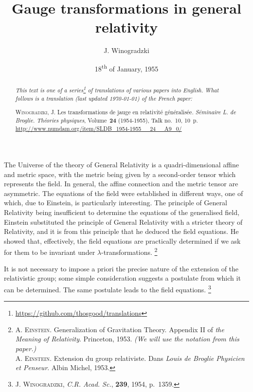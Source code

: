 \documentclass{article}
\newcommand{\oldpage}[1]{\marginpar{\footnotesize$\Big\vert$ \textit{p.~#1}}}
\begin{document}
\renewcommand{\abstractname}{Translator's note.}

\title{Gauge transformations in general relativity}
\author{J. Winogradzki}
\date{18\textsuperscript{th} of January, 1955}
\maketitle

\begin{abstract}
  \renewcommand*{\thefootnote}{\fnsymbol{footnote}}
  \emph{This text is one of a series\footnote{\url{https://github.com/thosgood/translations}} of translations of various papers into English.}
  \emph{What follows is a translation (last updated \today) of the French paper:}

  \medskip\noindent
  \textsc{Winogradzki, J}. Les transformations de jauge en relativité généralisée. \emph{Séminaire L. de Broglie. Théories physiques}, Volume~\textbf{24} (1954-1955), Talk no.~10, 10~p. {\footnotesize\url{http://www.numdam.org/item/SLDB_1954-1955__24__A9_0/}}
\end{abstract}

\setcounter{footnote}{0}

\tableofcontents



\bigskip\bigskip
\oldpage{10-01}
The Universe of the theory of General Relativity is a quadri-dimensional affine and metric space, with the metric being given by a second-order tensor which represents the field.
In general, the affine connection and the metric tensor are asymmetric.
The equations of the field were established in different ways, one of which, due to Einstein, is particularly interesting.
The principle of General Relativity being insufficient to determine the equations of the generalised field, Einstein substituted the principle of General Relativity with a stricter theory of Relativity, and it is from this principle that he deduced the field equations.
He showed that, effectively, the field equations are practically determined if we ask for them to be invariant under $\lambda$-transformations.
\footnote{\label{footnote1}\textsc{A. Einstein}. Generalization of Gravitation Theory. Appendix II of \emph{the Meaning of Relativity}. Princeton, 1953. \emph{(We will use the notation from this paper.)}\\\textsc{A. Einstein}. Extension du group relativiste. Dans \emph{Louis de Broglie Physicien et Penseur}. Albin Michel, 1953.}

It is not necessary to impose a priori the precise nature of the extension of the relativistic group; some simple consideration suggests a postulate from which it can be determined.
The same postulate leads to the field equations.
\footnote{\textsc{J. Winogradzki}, \emph{C.R. Acad. Sc.}, \textbf{239}, 1954, p.~1359.}
\end{document}
